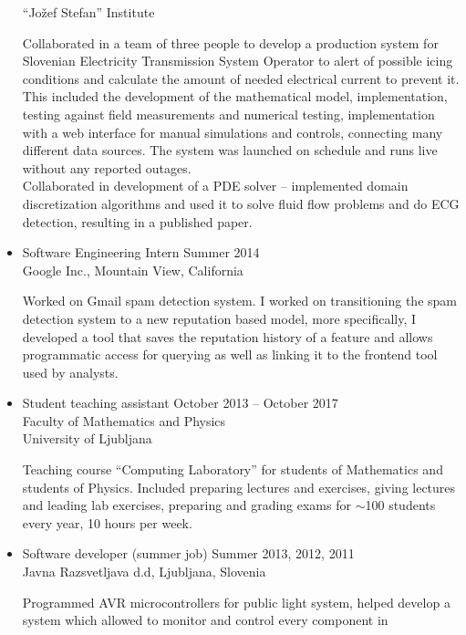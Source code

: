 \documentclass[line,margin]{res}
\newcommand{\wmeta}[1]{\sf#1\rm}
\newcommand{\wdesc}[1]{

#1

\vspace{6pt}}
\begin{document}
\begin{itemize}
{    \hspace*{\fill} ``Jožef Stefan'' Institute}
  \wdesc{Collaborated in a team of three people to develop a production system
    for Slovenian Electricity Transmission System Operator to alert of possible
    icing conditions and calculate the amount of needed electrical current to
    prevent it. This included the development of the mathematical model,
    implementation, testing against field measurements and numerical testing,
    implementation with a web interface for manual simulations and controls,
    connecting many different data sources. The system was launched on schedule
    and runs live without any reported outages. \\[3pt]
    Collaborated in development of a PDE solver  -- implemented domain
    discretization algorithms and used it to solve fluid flow problems and do
    ECG detection, resulting in a published paper.}
  \item \wmeta{Software Engineering Intern \hfill Summer 2014 \\
    \hspace*{\fill} Google Inc., Mountain View, California}
  \wdesc{Worked on Gmail spam detection system. I worked on transitioning
    the spam detection system to a new reputation based model, more
    specifically, I developed a tool that saves the reputation history of a
    feature and allows programmatic access for querying as well as linking it to
    the frontend tool used by analysts.}
  \item \wmeta{Student teaching assistant \hfill October 2013 -- October 2017 \\
    \hspace*{\fill}  Faculty of Mathematics and Physics \\
    \hspace*{\fill}  University of Ljubljana}
  \wdesc{Teaching course ``Computing Laboratory'' for students of Mathematics and
    students of Physics. Included preparing lectures and exercises, giving
    lectures and leading lab exercises, preparing and grading exams for
    $\sim$100 students every year, 10 hours per week.}
  \item \wmeta{Software developer (summer job) \hfill Summer 2013, 2012, 2011 \\
    \hspace*{\fill} Javna Razsvetljava d.d, Ljubljana, Slovenia}
  \wdesc{Programmed AVR microcontrollers for public light system, helped
    develop a system which allowed to monitor and control every component in
}
\end{itemize}
\end{document}
